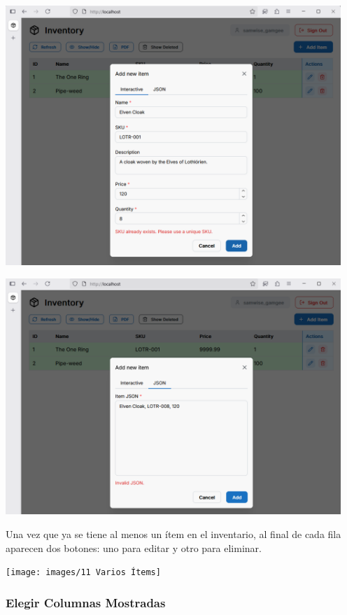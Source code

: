 \begin{center}
\includegraphics[width=0.95\textwidth]{images/9 Agregar Error}
\end{center}
\begin{center}
\includegraphics[width=0.95\textwidth]{images/10 Agregar Error JSOn}
\end{center}

Una vez que ya se tiene al menos un ítem en el inventario, al final de cada fila aparecen dos botones: uno para editar y otro para eliminar.

\begin{center}
\texttt{[image: images/11 Varios Ítems]}
\end{center}

\subsubsection{Elegir Columnas Mostradas}

